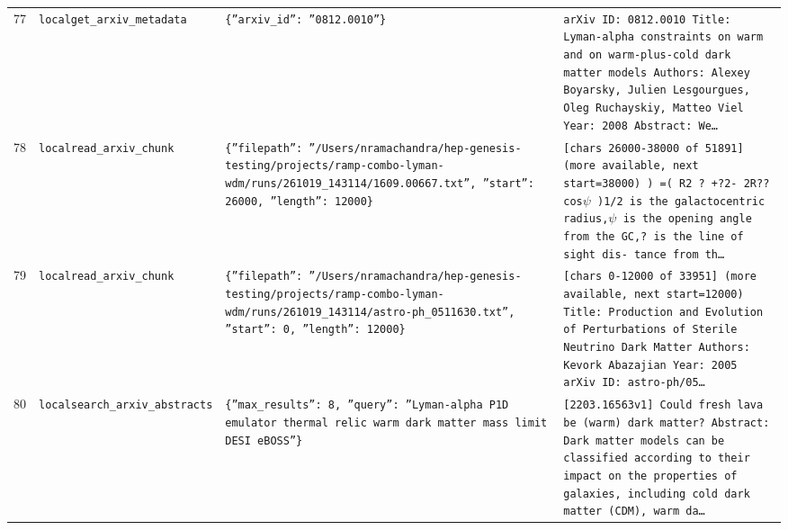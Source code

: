 \documentclass[11pt,a4paper]{article}
\begin{document}
\begin{longtable}{@{}p{}p{}p{}p{}@{}}
77 & \texttt{local}\newline\texttt{get\_\allowbreak{}arxiv\_\allowbreak{}metadata} & \texttt{\{''arxiv\_\allowbreak{}id'':\allowbreak{} ''0812.0010''\}\allowbreak{}} & \texttt{arXiv ID:\allowbreak{} 0812.0010 Title:\allowbreak{} Lyman-alpha constraints on warm and on warm-plus-cold dark matter models Authors:\allowbreak{} Alexey Boyarsky,\allowbreak{} Julien Lesgourgues,\allowbreak{} Oleg Ruchayskiy,\allowbreak{} Matteo Viel Year:\allowbreak{} 2008 Abstract:\allowbreak{}   We\ldots{}\allowbreak{}} \\
78 & \texttt{local}\newline\texttt{read\_\allowbreak{}arxiv\_\allowbreak{}chunk} & \texttt{\{''filepath'':\allowbreak{} ''/\allowbreak{}Users/\allowbreak{}nramachandra/\allowbreak{}hep-genesis-testing/\allowbreak{}projects/\allowbreak{}ramp-combo-lyman-wdm/\allowbreak{}runs/\allowbreak{}261019\_\allowbreak{}143114/\allowbreak{}1609.00667.txt'',\allowbreak{} ''start'':\allowbreak{} 26000,\allowbreak{} ''length'':\allowbreak{} 12000\}\allowbreak{}} & \texttt{[chars 26000-38000 of 51891]\allowbreak{} (more available,\allowbreak{} next start=\allowbreak{}38000)\allowbreak{}  )\allowbreak{} =\allowbreak{}( R2 ? +?2- 2R?? cos$\psi$ )\allowbreak{}1/\allowbreak{}2 is the galactocentric radius,\allowbreak{}$\psi$ is the opening angle from the GC,\allowbreak{}? is the line of sight dis- tance from th\ldots{}\allowbreak{}} \\
79 & \texttt{local}\newline\texttt{read\_\allowbreak{}arxiv\_\allowbreak{}chunk} & \texttt{\{''filepath'':\allowbreak{} ''/\allowbreak{}Users/\allowbreak{}nramachandra/\allowbreak{}hep-genesis-testing/\allowbreak{}projects/\allowbreak{}ramp-combo-lyman-wdm/\allowbreak{}runs/\allowbreak{}261019\_\allowbreak{}143114/\allowbreak{}astro-ph\_\allowbreak{}0511630.txt'',\allowbreak{} ''start'':\allowbreak{} 0,\allowbreak{} ''length'':\allowbreak{} 12000\}\allowbreak{}} & \texttt{[chars 0-12000 of 33951]\allowbreak{} (more available,\allowbreak{} next start=\allowbreak{}12000)\allowbreak{}  Title:\allowbreak{} Production and Evolution of Perturbations of Sterile Neutrino Dark Matter Authors:\allowbreak{} Kevork Abazajian Year:\allowbreak{} 2005 arXiv ID:\allowbreak{} astro-ph/\allowbreak{}05\ldots{}\allowbreak{}} \\
80 & \texttt{local}\newline\texttt{search\_\allowbreak{}arxiv\_\allowbreak{}abstracts} & \texttt{\{''max\_\allowbreak{}results'':\allowbreak{} 8,\allowbreak{} ''query'':\allowbreak{} ''Lyman-alpha P1D emulator thermal relic warm dark matter mass limit DESI eBOSS''\}\allowbreak{}} & \texttt{[2203.16563v1]\allowbreak{} Could fresh lava be (warm)\allowbreak{} dark matter? Abstract:\allowbreak{} Dark matter models can be classified according to their impact on the properties of galaxies,\allowbreak{} including cold dark matter (CDM)\allowbreak{},\allowbreak{} warm da\ldots{}\allowbreak{}} \\

\end{longtable}
\end{document}
